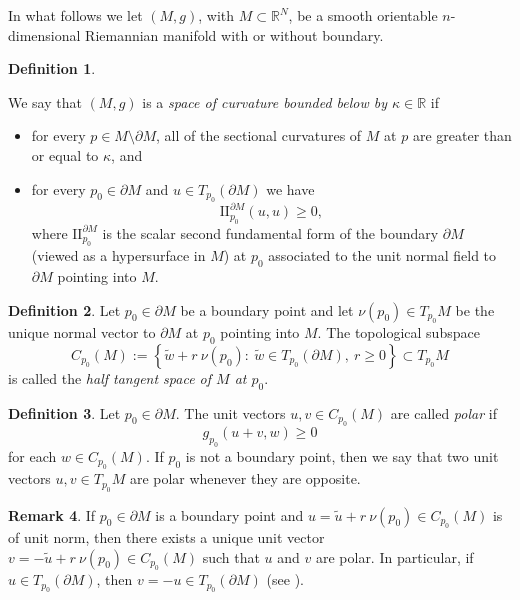 \documentclass[11pt]{article}
\theoremstyle{definition}
\newtheorem{definition}{Definition}[section]
\newtheorem{remark}[definition]{Remark}
\theoremstyle{remark}
\theoremstyle{plain}
\newcommand{\R}{\mathbb{R}}
\begin{document}
In what follows we let $(M,g)$, with $M\subset \R^N$, be a smooth orientable $n$-dimensional Riemannian manifold with or without boundary.

\begin{definition}\label{def:space_curvature_below}

We say that $(M,g)$ is a \textit{space of curvature bounded below by $\kappa\in \R$} if 
\begin{itemize}
  \item for every $p\in M\setminus \partial M$, all of the sectional curvatures of $M$ at $p$ are greater than or equal to $\kappa$, and
  \item for every $p_0\in \partial M$ and $u\in T_{p_0}(\partial M)$ we have 
      $$\mbox{II}_{p_0}^{\partial M}(u,u) \ge 0,$$
      where $\mbox{II}_{p_0}^{\partial M}$ is the scalar second fundamental form of the boundary $\partial M$ (viewed as a hypersurface in $M$) at $p_0$ associated to the unit normal field to $\partial M$ pointing into $M$.  
\end{itemize}

\end{definition}

\begin{definition}

Let $p_0\in\partial M$ be a boundary point and let $\nu(p_0)\in T_{p_0}M$ be the unique normal vector to $\partial M$ at $p_0$ pointing into $M$. The topological subspace
$$C_{p_0}(M):= \left\{\tilde w + r\ \nu(p_0):\ \tilde{w}\in T_{p_0}(\partial M),\ r\ge0\right\}\subset T_{p_0}M$$
is called the \emph{half tangent space of $M$ at $p_0$}.

\end{definition}


\begin{definition}\label{def:polar_vectors}
Let $p_0\in \partial M$. The unit vectors $u,v\in C_{p_0}(M)$ are called \textit{polar} if 
$$g_{p_0}(u+v,w) \ge 0$$ 
for each $w\in C_{p_0}(M)$. If $p_0$ is not a boundary point, then we say that two unit vectors $u,v\in T_{p_0}M$ are polar whenever they are opposite.
\end{definition}

\begin{remark}

If $p_0\in \partial M$ is a boundary point and $u = \tilde u + r\ \nu(p_0)\in C_{p_0}(M)$ is of unit norm, then there exists a unique unit vector $v = -\tilde u + r\ \nu(p_0)\in C_{p_0}(M)$ such that $u$ and $v$ are polar. In particular, if $u\in T_{p_0}(\partial M)$, then $v=-u\in T_{p_0}(\partial M)$ (see ).

\end{remark}
\end{document}
